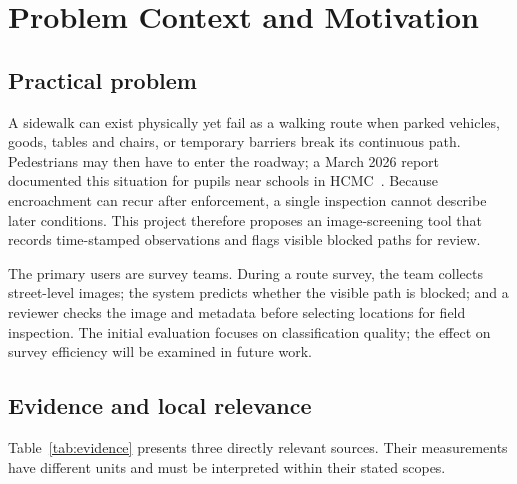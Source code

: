 \section{Problem Context and Motivation}

\subsection{Practical problem}

A sidewalk can exist physically yet fail as a walking route when parked vehicles, goods, tables and chairs, or temporary barriers break its continuous path. Pedestrians may then have to enter the roadway; a March 2026 report documented this situation for pupils near schools in HCMC~\cite{thanhnien2026students}. Because encroachment can recur after enforcement, a single inspection cannot describe later conditions. This project therefore proposes an image-screening tool that records time-stamped observations and flags visible blocked paths for review.

The primary users are survey teams. During a route survey, the team collects street-level images; the system predicts whether the visible path is blocked; and a reviewer checks the image and metadata before selecting locations for field inspection. The initial evaluation focuses on classification quality; the effect on survey efficiency will be examined in future work.

\subsection{Evidence and local relevance}

Table~\ref{tab:evidence} presents three directly relevant sources. Their measurements have different units and must be interpreted within their stated scopes.

